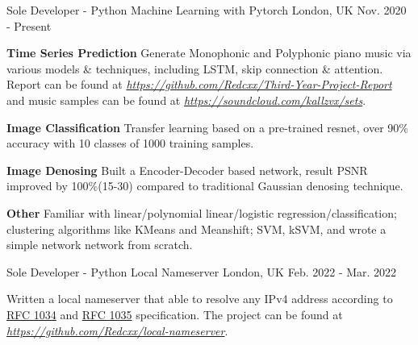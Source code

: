 \begin{cventries}
  \cventry
    {Sole Developer - Python} %
    {Machine Learning with Pytorch} %
    {London, UK} %
    {Nov. 2020 - Present} %
    {
      \begin{cvitems} %
        \item {\textbf{Time Series Prediction} Generate Monophonic and Polyphonic piano music via various models \& techniques, including LSTM, skip connection \& attention. Report can be found at \href{https://github.com/Redcxx/Third-Year-Project-Report}{\textit{https://github.com/Redcxx/Third-Year-Project-Report}} and music samples can be found at \href{https://soundcloud.com/kallzvx/sets}{\textit{https://soundcloud.com/kallzvx/sets}}.}
        \item {\textbf{Image Classification} Transfer learning based on a pre-trained resnet, over 90\% accuracy with 10 classes of 1000 training samples.}
        \item {\textbf{Image Denosing} Built a Encoder-Decoder based network, result PSNR improved  by 100\%(15-30) compared to traditional Gaussian denosing technique.}
        \item {\textbf{Other} Familiar with linear/polynomial linear/logistic regression/classification; clustering algorithms like KMeans and Meanshift; SVM, kSVM, and wrote a simple network network from scratch.}
      \end{cvitems}
    }
    


  
  \cventry
    {Sole Developer - Python} %
    {Local Nameserver} %
    {London, UK} %
    {Feb. 2022 - Mar. 2022} %
    {
      \begin{cvitems} %
        \item {Written a local nameserver that able to resolve any IPv4 address according to \href{https://datatracker.ietf.org/doc/html/rfc1034}{RFC 1034} and \href{https://datatracker.ietf.org/doc/html/rfc1035}{RFC 1035} specification. The project can be found at \href{https://github.com/Redcxx/local-nameserver}{\textit{https://github.com/Redcxx/local-nameserver}}.}
      \end{cvitems}
    }
  

\end{cventries}
